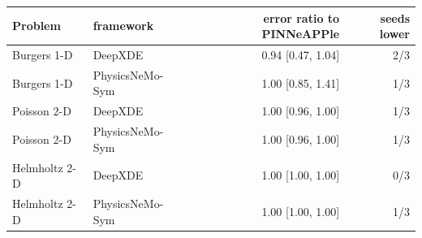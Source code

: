 \begin{tabular}{llrr}
\toprule
Problem & framework & error ratio to PINNeAPPle & seeds lower \\
\midrule
Burgers 1-D & DeepXDE & 0.94 [0.47, 1.04] & 2/3 \\
Burgers 1-D & PhysicsNeMo-Sym & 1.00 [0.85, 1.41] & 1/3 \\
Poisson 2-D & DeepXDE & 1.00 [0.96, 1.00] & 1/3 \\
Poisson 2-D & PhysicsNeMo-Sym & 1.00 [0.96, 1.00] & 1/3 \\
Helmholtz 2-D & DeepXDE & 1.00 [1.00, 1.00] & 0/3 \\
Helmholtz 2-D & PhysicsNeMo-Sym & 1.00 [1.00, 1.00] & 1/3 \\
\bottomrule
\end{tabular}
